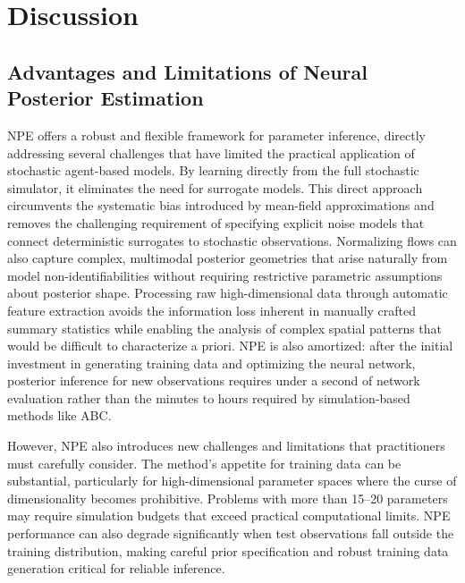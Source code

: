 \documentclass{article}
\begin{document}
\section{Discussion}\label{sec:discussion}

\subsection{Advantages and Limitations of Neural Posterior Estimation}

NPE offers a robust and flexible framework for parameter inference, directly addressing several challenges that have limited the practical application of stochastic agent-based models. By learning directly from the full stochastic simulator, it eliminates the need for surrogate models. This direct approach circumvents the systematic bias introduced by mean-field approximations and removes the challenging requirement of specifying explicit noise models that connect deterministic surrogates to stochastic observations. Normalizing flows can also capture complex, multimodal posterior geometries that arise naturally from model non-identifiabilities without requiring restrictive parametric assumptions about posterior shape. Processing raw high-dimensional data through automatic feature extraction avoids the information loss inherent in manually crafted summary statistics while enabling the analysis of complex spatial patterns that would be difficult to characterize a priori. NPE is also amortized: after the initial investment in generating training data and optimizing the neural network, posterior inference for new observations requires under a second of network evaluation rather than the minutes to hours required by simulation-based methods like ABC.

However, NPE also introduces new challenges and limitations that practitioners must carefully consider. The method's appetite for training data can be substantial, particularly for high-dimensional parameter spaces where the curse of dimensionality becomes prohibitive. Problems with more than 15--20 parameters may require simulation budgets that exceed practical computational limits. NPE performance can also degrade significantly when test observations fall outside the training distribution, making careful prior specification and robust training data generation critical for reliable inference.
\end{document}
